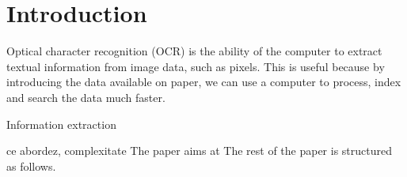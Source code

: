 \section{Introduction}
Optical character recognition (OCR) is the ability of the computer to extract textual information from image data, such as pixels. This is useful because by introducing the data available on paper, we can use a computer to process, index and search the data much faster.  

Information extraction

ce abordez, complexitate
The paper aims at 
The rest of the paper is structured as follows.